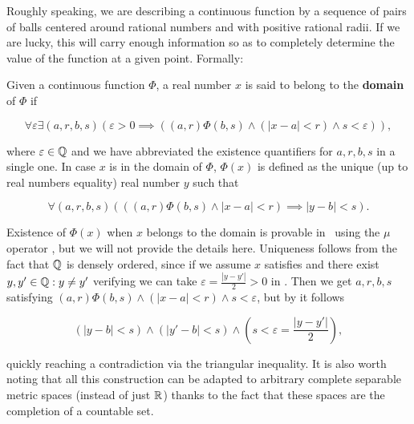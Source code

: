 \documentclass[../main.tex]{memoir}
\begin{document}
Roughly speaking, we are describing a continuous function by a sequence of pairs of balls centered around rational numbers and with positive rational radii. If we are lucky, this will carry enough information so as to completely determine the value of the function at a given point. Formally:

\begin{definition}
  Given a continuous function $\Phi$, a real number $x$ is said to belong to the \textbf{domain} of $\Phi$ if

  \begin{equation}
    \label{eq:continuity-at-point}
    \forall \varepsilon \exists (a, r, b, s) (\varepsilon > 0 \implies ((a, r)\Phi(b, s) \land (|x - a| < r) \land s < \varepsilon)),
  \end{equation}

  where $\varepsilon \in \mathbb{Q}$ and we have abbreviated the existence quantifiers for $a, r, b, s$ in a single one. In case $x$ is in the domain of $\Phi$, $\Phi(x)$ is defined as the unique (up to real numbers equality) real number $y$ such that

  \begin{equation}
    \label{eq:separable-image}
    \forall (a, r, b, s) (((a, r)\Phi(b, s) \land |x - a| < r) \implies |y - b| < s).
  \end{equation}
\end{definition}

\begin{remark}
  Existence of $\Phi(x)$ when $x$ belongs to the domain is provable in \rca\ using the $\mu$ operator \cite{simpson}, but we will not provide the details here. Uniqueness follows from the fact that $\mathbb{Q}$ is densely ordered, since if we assume $x$ satisfies  and there exist $y, y' \in \mathbb{Q}: y \neq y'$ verifying  we can take $\varepsilon = \frac{|y - y'|}{2} > 0$ in . Then we get $a, r, b, s$ satisfying $(a, r)\Phi(b, s) \land (|x - a| < r) \land s < \varepsilon$, but by  it follows

  \[ (|y - b| < s) \land (|y' - b| < s) \land (s < \varepsilon = \frac{|y - y'|}{2}), \]

  quickly reaching a contradiction via the triangular inequality. It is also worth noting that all this construction can be adapted to arbitrary complete separable metric spaces (instead of just $\mathbb{R}$) thanks to the fact that these spaces are the completion of a countable set.
\end{remark}
\end{document}
